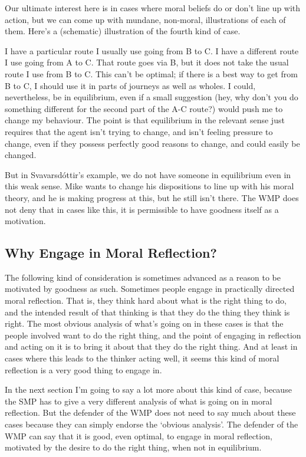 Our ultimate interest here is in cases where moral beliefs do or don't line up with action, but we can come up with mundane, non-moral, illustrations of each of them. Here's a (schematic) illustration of the fourth kind of case.

I have a particular route I usually use going from B to C. I have a different route I use going from A to C. That route goes via B, but it does not take the usual route I use from B to C. This can't be optimal; if there is a best way to get from B to C, I should use it in parts of journeys as well as wholes. I could, nevertheless, be in equilibrium, even if a small suggestion (hey, why don't you do something different for the second part of the A-C route?) would push me to change my behaviour. The point is that equilibrium in the relevant sense just requires that the agent isn't trying to change, and isn't feeling pressure to change, even if they possess perfectly good reasons to change, and could easily be changed.

But in Svavarsdóttir's example, we do not have someone in equilibrium even in this weak sense. \gls{Mike} wants to change his dispositions to line up with his moral theory, and he is making progress at this, but he still isn't there. The WMP does not deny that in cases like this, it is permissible to have goodness itself as a motivation.

\subsection{Why Engage in Moral Reflection?}
\label{whyengageinmoralreflection}

The following kind of consideration is sometimes advanced as a reason to be motivated by goodness as such. Sometimes people engage in practically directed moral reflection. That is, they think hard about what is the right thing to do, and the intended result of that thinking is that they do the thing they think is right. The most obvious analysis of what's going on in these cases is that the people involved want to do the right thing, and the point of engaging in reflection and acting on it is to bring it about that they do the right thing. And at least in cases where this leads to the thinker acting well, it seems this kind of moral reflection is a very good thing to engage in.

In the next section I'm going to say a lot more about this kind of case, because the SMP has to give a very different analysis of what is going on in moral reflection. But the defender of the WMP does not need to say much about these cases because they can simply endorse the `obvious analysis'. The defender of the WMP can say that it is good, even optimal, to engage in moral reflection, motivated by the desire to do the right thing, when not in equilibrium.

